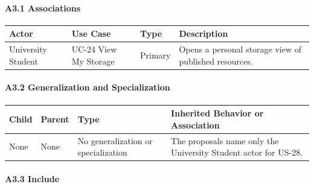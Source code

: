 \documentclass[12pt]{article}
\renewcommand{\baselinestretch}{1.5}
\begin{document}
\hypertarget{sec:a3-1-associations}{}
\paragraph*{A3.1 Associations}
\par\medskip

\begingroup
\small
\renewcommand{\baselinestretch}{1.0}\selectfont
\renewcommand{\arraystretch}{1.15}
\setlength{\tabcolsep}{6pt}
\begin{longtable}{|>{\raggedright\arraybackslash}p{}|>{\raggedright\arraybackslash}p{}|>{\raggedright\arraybackslash}p{}|>{\raggedright\arraybackslash}p{}|}
\hline
\textbf{Actor} & \textbf{Use Case} & \textbf{Type} & \textbf{Description} \\ \hline
\endhead
University Student & UC-24 View My Storage & Primary & Opens a personal storage view of published resources. \\ \hline
\end{longtable}
\endgroup
\par\medskip

\hypertarget{sec:a3-2-generalization-and-specialization}{}
\paragraph*{A3.2 Generalization and Specialization}
\par\medskip

\begingroup
\small
\renewcommand{\baselinestretch}{1.0}\selectfont
\renewcommand{\arraystretch}{1.15}
\setlength{\tabcolsep}{6pt}
\begin{longtable}{|>{\raggedright\arraybackslash}p{}|>{\raggedright\arraybackslash}p{}|>{\raggedright\arraybackslash}p{}|>{\raggedright\arraybackslash}p{}|}
\hline
\textbf{Child} & \textbf{Parent} & \textbf{Type} & \textbf{Inherited Behavior or Association} \\ \hline
\endhead
None & None & No generalization or specialization & The proposals name only the University Student actor for US-28. \\ \hline
\end{longtable}
\endgroup
\par\medskip

\hypertarget{sec:a3-3-include}{}
\paragraph*{A3.3 Include}
\par\medskip
\end{document}
